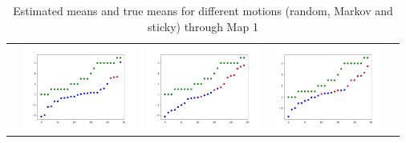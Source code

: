 \documentclass{article}
\begin{document}
\newcommand{\addrandommeana}{\includegraphics[width=10em]{images/hdphsmm/random-m1-means.png}}
\newcommand{\addmarkovmeana}{\includegraphics[width=10em]{images/hdphsmm/markov-m1-means.png}}
\newcommand{\addcorrmeana}{\includegraphics[width=10em]{images/hdphsmm/corr-m1-means.png}}
\begin{table}[H]
\sffamily
\centering
\begin{tabular}{l*4{C}@{}}
& \addrandommeana & \addmarkovmeana & \addcorrmeana \\
\end{tabular}
\caption{Estimated means and true means for different motions (random, Markov and sticky) through Map 1}
\label{table:meaninfer}
\end{table}
\end{document}
